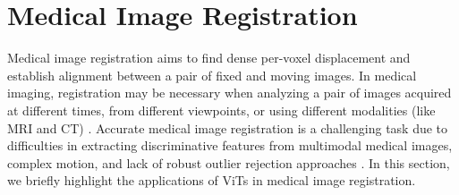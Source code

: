 \documentclass[10pt,journal,compsoc]{IEEEtran}
\begin{document}
\section{Medical Image Registration} \label{sec:reg}

Medical image registration aims to find dense per-voxel displacement and establish alignment between a pair of fixed and moving images. In medical imaging, registration may be necessary when analyzing a pair of images acquired at different times, from different viewpoints, or using different modalities (like MRI and CT) \cite{haskins2020deep}. Accurate medical image registration is a challenging task due to difficulties in extracting discriminative features from multimodal medical images, complex motion, and lack of robust outlier rejection approaches \cite{alam2018medical}. In this section, we briefly highlight the applications of ViTs in medical image registration.
\end{document}
